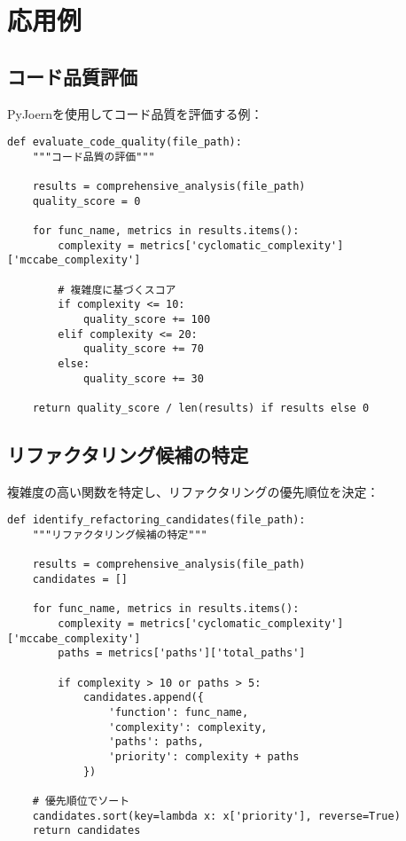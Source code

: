 \documentclass[12pt,a4paper]{article}
\begin{document}
\section{応用例}

\subsection{コード品質評価}

PyJoernを使用してコード品質を評価する例：

\begin{lstlisting}[caption=コード品質評価]
def evaluate_code_quality(file_path):
    """コード品質の評価"""

    results = comprehensive_analysis(file_path)
    quality_score = 0

    for func_name, metrics in results.items():
        complexity = metrics['cyclomatic_complexity']['mccabe_complexity']

        # 複雑度に基づくスコア
        if complexity <= 10:
            quality_score += 100
        elif complexity <= 20:
            quality_score += 70
        else:
            quality_score += 30

    return quality_score / len(results) if results else 0
\end{lstlisting}

\subsection{リファクタリング候補の特定}

複雑度の高い関数を特定し、リファクタリングの優先順位を決定：

\begin{lstlisting}[caption=リファクタリング候補の特定]
def identify_refactoring_candidates(file_path):
    """リファクタリング候補の特定"""

    results = comprehensive_analysis(file_path)
    candidates = []

    for func_name, metrics in results.items():
        complexity = metrics['cyclomatic_complexity']['mccabe_complexity']
        paths = metrics['paths']['total_paths']

        if complexity > 10 or paths > 5:
            candidates.append({
                'function': func_name,
                'complexity': complexity,
                'paths': paths,
                'priority': complexity + paths
            })

    # 優先順位でソート
    candidates.sort(key=lambda x: x['priority'], reverse=True)
    return candidates
\end{lstlisting}
\end{document}
